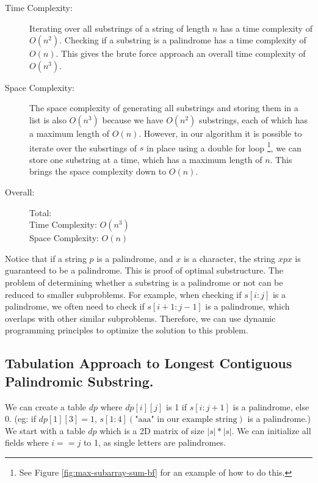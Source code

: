 \begin{description}
    \item[Time Complexity:]
        Iterating over all substrings of a string of length $n$ has a time complexity of $O(n^2)$.
        Checking if a substring is a palindrome has a time complexity of $O(n)$.
        This gives the brute force approach an overall time complexity of $O(n^3)$.
        
    \item[Space Complexity:] 
        The space complexity of generating all substrings and storing them in a list is also $O(n^3)$
        because we have $O(n^2)$ substrings, each of which has a maximum length of $O(n)$.
        However, in our algorithm it is possible to iterate over the subsrtings of $s$ in place using a double for loop
        \footnote{See Figure \ref{fig:max-subarray-sum-bf} for an example of how to do this.}, we can store one substring at a time,
        which has a maximum length of $n$. This brings the space complexity down to $O(n)$.
        
    \item[Overall:] Total:\\
        Time Complexity: $O(n^3)$\\
        Space Complexity: $O(n)$
    
\end{description}
Notice that if a string $p$ is a palindrome, and $x$ is a character, the string $xpx$ is guaranteed to be a palindrome.
This is proof of optimal substructure.
The problem of determining whether a substring is a palindrome or not can be reduced to smaller subproblems.
For example, when checking if $s[i:j]$ is a palindrome, we often need to check if $s[i+1:j-1]$ is a palindrome,
which overlaps with other similar subproblems.
Therefore, we can use dynamic programming principles to optimize the solution to this problem.
\subsection{Tabulation Approach to Longest Contiguous Palindromic Substring.}
We can create a table $dp$ where $dp[i][j]$ is 1 if $s[i:j+1]$ is a palindrome, else 0. (eg: if $dp[1][3] = 1$, $s[1:4] (\text{"aaa" in our example string})$ is a palindrome.)
We start with a table $dp$ which is a 2D matrix of size $|s| * |s|$.
We can initialize all fields where $i == j$ to 1, as single letters are palindromes.

